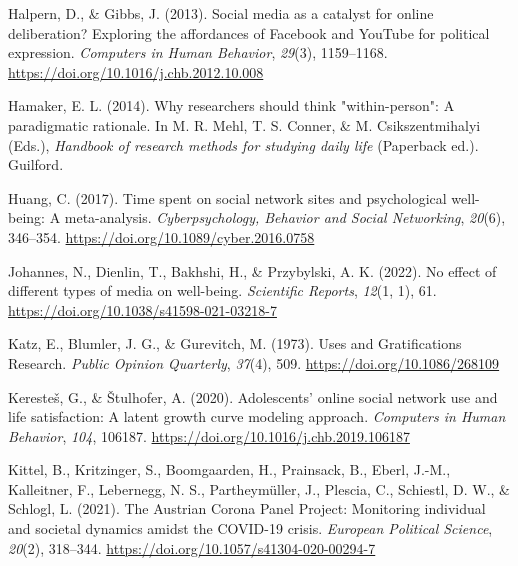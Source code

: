 \documentclass[
  man,mask]{apa7}
\newlength{\cslhangindent}
\newlength{\cslentryspacingunit} %
\newenvironment{CSLReferences}[2] %
 {%
  \setlength{\parindent}{0pt}
  \ifodd #1
  \let\oldpar\par
  \def\par{\hangindent=\cslhangindent\oldpar}
  \fi
  \setlength{\parskip}{#2\cslentryspacingunit}
 }%
 {}
\begin{document}
\begin{CSLReferences}{1}{0}
\leavevmode{}%
Halpern, D., \& Gibbs, J. (2013). Social media as a catalyst for online deliberation? {Exploring} the affordances of {Facebook} and {YouTube} for political expression. \emph{Computers in Human Behavior}, \emph{29}(3), 1159--1168. \url{https://doi.org/10.1016/j.chb.2012.10.008}

\leavevmode{}%
Hamaker, E. L. (2014). Why researchers should think "within-person": {A} paradigmatic rationale. In M. R. Mehl, T. S. Conner, \& M. Csikszentmihalyi (Eds.), \emph{Handbook of research methods for studying daily life} (Paperback ed.). {Guilford}.

\leavevmode{}%
Huang, C. (2017). Time spent on social network sites and psychological well-being: {A} meta-analysis. \emph{Cyberpsychology, Behavior and Social Networking}, \emph{20}(6), 346--354. \url{https://doi.org/10.1089/cyber.2016.0758}

\leavevmode{}%
Johannes, N., Dienlin, T., Bakhshi, H., \& Przybylski, A. K. (2022). No effect of different types of media on well-being. \emph{Scientific Reports}, \emph{12}(1, 1), 61. \url{https://doi.org/10.1038/s41598-021-03218-7}

\leavevmode{}%
Katz, E., Blumler, J. G., \& Gurevitch, M. (1973). Uses and {Gratifications Research}. \emph{Public Opinion Quarterly}, \emph{37}(4), 509. \url{https://doi.org/10.1086/268109}

\leavevmode{}%
Keresteš, G., \& Štulhofer, A. (2020). Adolescents' online social network use and life satisfaction: {A} latent growth curve modeling approach. \emph{Computers in Human Behavior}, \emph{104}, 106187. \url{https://doi.org/10.1016/j.chb.2019.106187}

\leavevmode{}%
Kittel, B., Kritzinger, S., Boomgaarden, H., Prainsack, B., Eberl, J.-M., Kalleitner, F., Lebernegg, N. S., Partheymüller, J., Plescia, C., Schiestl, D. W., \& Schlogl, L. (2021). The {Austrian Corona Panel Project}: Monitoring individual and societal dynamics amidst the {COVID-19} crisis. \emph{European Political Science}, \emph{20}(2), 318--344. \url{https://doi.org/10.1057/s41304-020-00294-7}


\end{CSLReferences}
\end{document}
